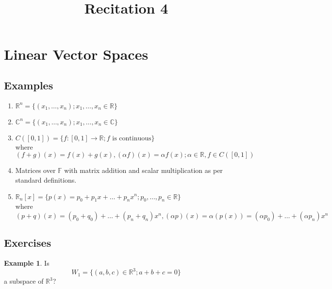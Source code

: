\documentclass[fleqn, a4paper, 12pt]{article}
\title{Recitation 4}
\author{}
\date{\formatdate{19}{11}{2014}}
\theoremstyle{definition}
\newtheorem{example}{Example}
\theoremstyle{theorem}
\begin{document}
\maketitle

\tableofcontents

\newpage
\section{Linear Vector Spaces}

\subsection{Examples}

\begin{enumerate}
	\item $\mathbb{R}^n = \{(x_1, \dots, x_n) ; x_1, \dots, x_n \in \mathbb{R}\}$
	\item $\mathbb{C}^n = \{(x_1, \dots, x_n) ; x_1, \dots, x_n \in \mathbb{C}\}$
	\item $C([0, 1]) = \{f:[0,1] \rightarrow \mathbb{R} ; f \text{ is continuous}\}$\\
	where $(f+g)(x) = f(x) + g(x), (\alpha f)(x) = \alpha f(x) ; \alpha \in \mathbb{R}, f \in C([0, 1])$
	\item Matrices over $\mathbb{F}$ with matrix addition and scalar multiplication as per standard definitions.
	\item $\mathbb{R}_n[x] = \{p(x) = p_0 + p_1 x + \dots + p_n x^n ; p_0, \dots, p_n \in \mathbb{R}\}$\\
	where $(p+q)(x) = (p_0 + q_0) + \dots + (p_n + q_n) x^n, (\alpha p)(x) = \alpha (p(x)) = (\alpha p_0) + \dots + (\alpha p_n) x^n$
\end{enumerate}

\subsection{Exercises}

\begin{example}
	Is
	\begin{equation*}
		W_1 = \{(a, b, c) \in \mathbb{R}^3 ; a + b + c = 0\}
	\end{equation*}
	a subspace of $\mathbb{R}^3$?
\end{example}
\end{document}
